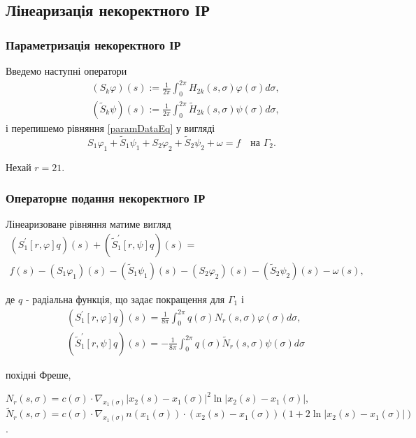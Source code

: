 \documentclass[10pt]{beamer}
\begin{document}
\subsection{Лінеаризація некоректного ІР}
 \begin{frame}
\frametitle{Параметризація некоректного ІР}

Введемо наступні оператори
 \begin{equation}
 \begin{split}
	&(S_{k}\varphi)(s):=\frac{1}{2\pi}\int_{0}^{2\pi}H_{2k}(s, \sigma)\varphi(\sigma)d\sigma, \\ 
	&(\tilde{S}_{k}\psi)(s):=\frac{1}{2\pi}\int_{0}^{2\pi}\tilde{H}_{2k}(s, \sigma)\psi(\sigma)d\sigma, \nonumber
 \end{split}
 \end{equation}
і перепишемо рівняння \eqref{paramDataEq} у вигляді
 \begin{equation}
	S_{1}\varphi_1+\tilde{S}_{1}\psi_1+S_{2}\varphi_2+\tilde{S}_{2}\psi_2+\omega=f \quad \textrm{на } \Gamma_2. 
 \end{equation}
 
 Нехай $r=21$.
 
\end{frame}
  
 \begin{frame}
\frametitle{Операторне подання некоректного ІР}

Лінеаризоване рівняння матиме вигляд
\begin{equation}
  \label{lineriazed}
   \begin{multlined}
	(S_1^{'}[r,\varphi]q)(s) + (\tilde{S}_1^{'}[r,\psi]q)(s)=\\f(s)-(S_{1}\varphi_1)(s)-(\tilde{S}_{1}\psi_1)(s)-(S_{2}\varphi_2)(s)-(\tilde{S}_{2}\psi_2)(s)-\omega(s),
 \end{multlined}
 \end{equation}
 
 де $q$ - радіальна функція, що задає покращення для $\Gamma_1$ і
  \begin{equation}
 \begin{split}
	&(S_1^{'}[r,\varphi]q)(s)=\frac{1}{8\pi}\int_{0}^{2\pi}q(\sigma)N_{r}(s, \sigma)\varphi(\sigma)d\sigma,  \\ 
	&(\tilde{S}_1^{'}[r,\psi]q)(s)=-\frac{1}{8\pi}\int_{0}^{2\pi}q(\sigma)\tilde{N}_{r}(s, \sigma)\psi(\sigma)d\sigma \nonumber
 \end{split}
 \end{equation}
 
 похідні Фреше,
 
 $N_{r}(s, \sigma)=c(\sigma)\cdot\nabla_{x_{1}(\sigma)}|x_2(s)-x_1(\sigma)|^2\ln |x_2(s)-x_1(\sigma)|,$
 $\tilde{N}_{r}(s, \sigma)=c(\sigma)\cdot \nabla_{x_{1}(\sigma)} n(x_1(\sigma))\cdot(x_2(s)-x_1(\sigma))(1+2\ln|x_2(s)-x_1(\sigma)|)$.
 
\end{frame}
  
\end{document}
